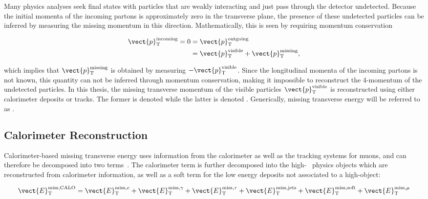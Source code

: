 
Many physics analyses seek final states with particles that are weakly
interacting and just pass through the detector undetected. Because the
initial momenta of the incoming partons is approximately zero in the
transverse plane, the presence of these undetected particles can be
inferred by measuring the missing momentum in this
direction. Mathematically, this is seen by requiring momentum conservation

\begin{equation}
\begin{aligned}
\vect{p}^{\textrm{incoming}}_{\textrm{T}} = 0 &=
\vect{p}^{\textrm{outgoing}}_{\textrm{T}} \\
&= \vect{p}^{\textrm{visible}}_{\textrm{T}} +
\vect{p}^{\textrm{missing}}_{\textrm{T}}, 
\end{aligned}
\end{equation}

\noindent
which implies that $\vect{p}^{\textrm{missing}}_{\textrm{T}}$ is
obtained by measuring
$-\vect{p}^{\textrm{visible}}_{\textrm{T}}$. Since the longitudinal momenta of the
incoming partons is not known, this quantity can not be inferred
through momentum conservation, making it impossible to reconstruct the
4-momentum of the undetected particles. In this thesis, the missing transverse
momentum of the visible particles
$\vect{p}^{\textrm{visible}}_{\textrm{T}}$ is reconstructed using
either calorimeter deposits or tracks. The former is denoted \calomet
while the latter is denoted \trkmet. Generically, missing transverse
energy will be referred to as \etmiss.

\subsection{Calorimeter \etmiss Reconstruction}

Calorimeter-based missing transverse energy uses information from the
calorimeter as well as the tracking systems for muons, and can
therefore be decomposed into two terms~\cite{bib:ATLAS-CONF-2013-082}. The calorimeter term is
further decomposed into the high-\pt~ physics objects which are
reconstructed from calorimeter information, as well as a soft term for
the low energy deposits not associated to a high-\pt object:

\begin{equation}
\vect{\ensuremath{E}}_{\mathrm{T}}^{\mathrm{miss, CALO}} =
\vect{\ensuremath{E}}_{\mathrm{T}}^{\mathrm{miss},e} +
\vect{\ensuremath{E}}_{\mathrm{T}}^{\mathrm{miss},\gamma} +
\vect{\ensuremath{E}}_{\mathrm{T}}^{\mathrm{miss},\tau} +
\vect{\ensuremath{E}}_{\mathrm{T}}^{\mathrm{miss,jets}} +
\vect{\ensuremath{E}}_{\mathrm{T}}^{\mathrm{miss,soft}} + 
\vect{\ensuremath{E}}_{\mathrm{T}}^{\mathrm{miss},\mu}
\label{chap:reco:equation:etmiss}
\end{equation}

